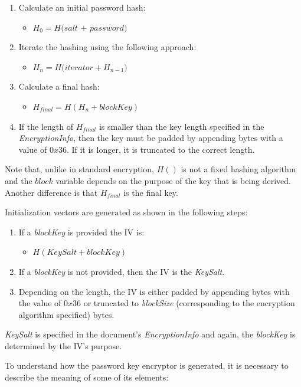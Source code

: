\documentclass[11pt,oneside]{fithesis2}
\begin{document}
\begin{enumerate}
\item{Calculate an initial password hash:}
	\begin{itemize}
		\item{$H_0 =\textit{H(salt + password)}$}
	\end{itemize}
\item{Iterate the hashing using the following approach:}
	\begin{itemize}
		\item{$H_n = \textit{H(iterator} + H_{n-1})$}
	\end{itemize}
\item{Calculate a final hash:}
	\begin{itemize}
		\item{$H_{final} = \textit{H}(H_n + blockKey)$}
	\end{itemize}
\item{If the length of $H_{final}$ is smaller than the key length specified in the \textit{EncryptionInfo}, then the key must be padded by appending bytes with a value of $0x36$. If it is longer, it is truncated to the correct length.}
\end{enumerate}

Note that, unlike in standard encryption, $H()$ is not a fixed hashing algorithm and the $block$ variable depends on the purpose of the key that is being derived. Another difference is that $H_{final}$ is the final key.

Initialization vectors are generated as shown in the following steps:
\begin{enumerate}
	\item{If a \textit{blockKey} is provided the IV is:}
	\begin{itemize}
		\item{$H(KeySalt + blockKey)$}
	\end{itemize}
	\item{If a \textit{blockKey} is not provided, then the IV is the \textit{KeySalt}.}
	\item{Depending on the length, the IV is either padded by appending bytes with the value of $0x36$ or truncated to \textit{blockSize} (corresponding to the encryption algorithm specified) bytes.}
\end{enumerate}

\textit{KeySalt} is specified in the document's \textit{EncryptionInfo} and again, the \textit{blockKey} is determined by the IV's purpose.

To understand how the password key encryptor is generated, it is necessary to describe the meaning of some of its elements:
\end{document}

